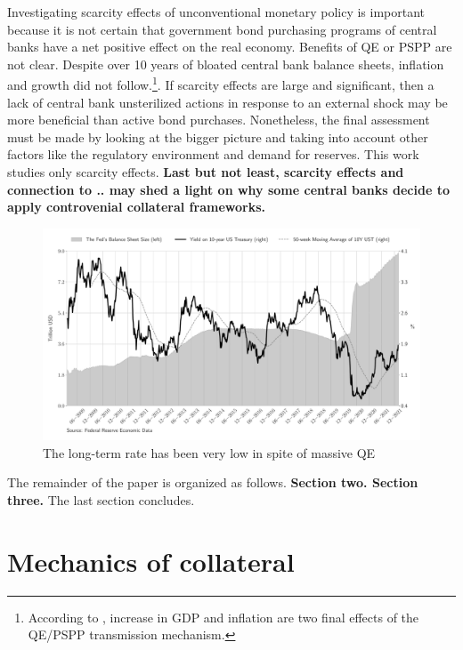 \documentclass[11pt,a4paper,english,oneside]{article}
\begin{document}
Investigating scarcity effects of unconventional monetary policy is important because it is not certain that government bond purchasing programs of central banks have a net positive effect on the real economy. Benefits of QE or PSPP are not clear. Despite over 10 years of bloated central bank balance sheets, inflation and growth did not follow.\footnote{According to \citet{gern2015}, increase in GDP and inflation are two final effects of the QE/PSPP transmission mechanism.}. If scarcity effects are large and significant, then a lack of central bank unsterilized actions in response to an external shock may be more beneficial than active bond purchases. Nonetheless, the final assessment must be made by looking at the bigger picture and taking into account other factors like the regulatory environment and demand for reserves. This work studies only scarcity effects. \textbf{Last but not least, scarcity effects and connection to .. may shed a light on why some central banks decide to apply controvenial collateral frameworks.}

\begin{figure}[htb!]
  \begin{center}
    \caption{The long-term rate has been very low in spite of massive QE}
    \includegraphics[width=0.99\linewidth]{fed_bs.pdf}
  \end{center}
  \label{Feds_BS}
\end{figure}

The remainder of the paper is organized as follows. \textbf{Section two. Section three.} The last section concludes.

\newpage

\section{Mechanics of collateral} \label{sec:mechanics}
\end{document}
